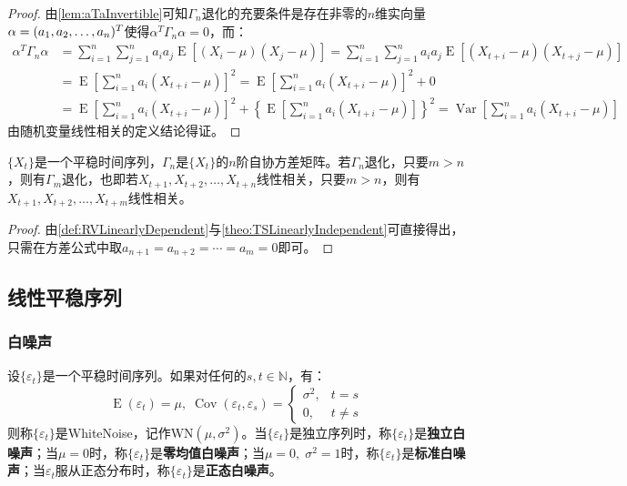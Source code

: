 \begin{proof}
	由\cref{lem:aTaInvertible}可知$\Gamma_n$退化的充要条件是存在非零的$n$维实向量$\alpha=(a_1, a_2, \dots, a_{n})^T$使得$\alpha^T\Gamma_n\alpha=0$，而：
	\begin{align*}
		\alpha^T\Gamma_n\alpha
		&=\sum_{i=1}^{n}\sum_{j=1}^{n}a_ia_j\operatorname{E}[(X_i-\mu)(X_j-\mu)] =\sum_{i=1}^{n}\sum_{j=1}^{n}a_ia_j\operatorname{E}[(X_{t+i}-\mu)(X_{t+j}-\mu)] \\
		&=\operatorname{E}\left[\sum_{i=1}^{n}a_i(X_{t+i}-\mu)\right]^2 =\operatorname{E}\left[\sum_{i=1}^{n}a_i(X_{t+i}-\mu)\right]^2+0 \\
		&=\operatorname{E}\left[\sum_{i=1}^{n}a_i(X_{t+i}-\mu)\right]^2+\left\{\operatorname{E}\left[\sum_{i=1}^{n}a_i(X_{t+i}-\mu)\right]\right\}^2 =\operatorname{Var}\left[\sum_{i=1}^{n}a_i(X_{t+i}-\mu)\right]
	\end{align*}
	由随机变量线性相关的定义结论得证。
\end{proof}
\begin{theorem}
	$\{X_t\}$是一个平稳时间序列，$\Gamma_n$是$\{X_t\}$的$n$阶自协方差矩阵。若$\Gamma_n$退化，只要$m>n$，则有$\Gamma_m$退化，也即若$X_{t+1},X_{t+2},\dots,X_{t+n}$线性相关，只要$m>n$，则有$X_{t+1},X_{t+2},\dots,X_{t+m}$线性相关。
\end{theorem}
\begin{proof}
	由\cref{def:RVLinearlyDependent}与\cref{theo:TSLinearlyIndependent}可直接得出，只需在方差公式中取$a_{n+1}=a_{n+2}=\cdots=a_{m}=0$即可。
\end{proof}


\subsection{线性平稳序列}
\subsubsection{白噪声}
\begin{definition}
	设$\{\varepsilon_t\}$是一个平稳时间序列。如果对任何的$s,t\in\mathbb{N}$，有：
	\begin{equation*}
		\operatorname{E}(\varepsilon_t)=\mu,\;
		\operatorname{Cov}(\varepsilon_t,\varepsilon_s)=
		\begin{cases}
			\sigma^2, & t=s \\
			0, & t\ne s
		\end{cases}
	\end{equation*}
	则称$\{\varepsilon_t\}$是\gls{WhiteNoise}，记作WN$(\mu,\sigma^2)$。当$\{\varepsilon_t\}$是独立序列时，称$\{\varepsilon_t\}$是\textbf{独立白噪声}；当$\mu=0$时，称$\{\varepsilon_t\}$是\textbf{零均值白噪声}；当$\mu=0,\;\sigma^2=1$时，称$\{\varepsilon_t\}$是\textbf{标准白噪声}；当$\varepsilon_t$服从正态分布时，称$\{\varepsilon_t\}$是\textbf{正态白噪声}。
\end{definition}

